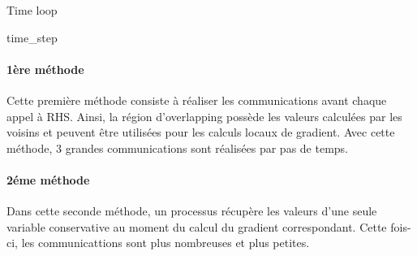 \begin{algorithm}
  \caption{Time loop}
  \label{algo:time_loop}
  \begin{algorithmic}
     \ENDFOR
  \end{algorithmic}
\end{algorithm}

\begin{algorithm}
  \caption{time\_step}
  \label{algo:time_step}
  \begin{algorithmic}
     \ENDFOR
  \end{algorithmic}
\end{algorithm}

\paragraph{1ère méthode}Cette première méthode consiste à réaliser les communications avant chaque appel à RHS. Ainsi, la région d'overlapping possède les valeurs calculées par les voisins et peuvent être utilisées pour les calculs locaux de gradient. Avec cette méthode, 3 grandes communications sont réalisées par pas de temps.

\paragraph{2éme méthode}Dans cette seconde méthode, un processus récupère les valeurs d'une seule variable conservative au moment du calcul du gradient correspondant. Cette fois-ci, les communicattions sont plus nombreuses et plus petites. 



